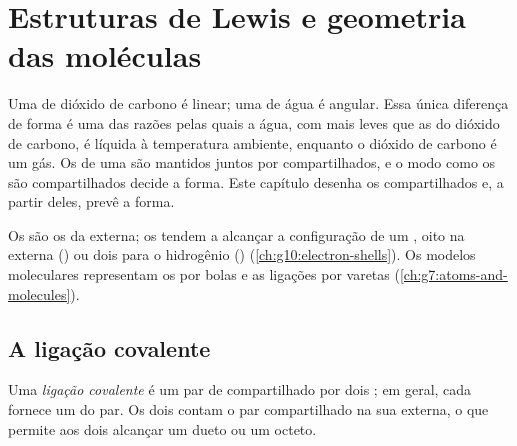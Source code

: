 \chapter{Estruturas de Lewis e geometria das moléculas}\label{ch:g10:lewis-and-shape}

Uma  de dióxido de carbono é linear; uma  de água é
angular. Essa única diferença de forma é uma das razões pelas quais a
água, com  mais leves que as do dióxido de carbono, é líquida à
temperatura ambiente, enquanto o dióxido de carbono é um gás. Os 
de uma  são mantidos juntos por  compartilhados, e o modo
como os  são compartilhados decide a forma. Este capítulo
desenha os  compartilhados e, a partir deles, prevê a forma.

\begin{recall}
Os  são os da  externa; os  tendem a
alcançar a configuração de um , oito  na  externa
() ou dois para o hidrogênio ()
(\cref{ch:g10:electron-shells}). Os modelos moleculares representam os
 por bolas e as ligações por varetas
(\cref{ch:g7:atoms-and-molecules}).
\end{recall}

\section{A ligação covalente}

\begin{definition}\label{def:g10:lewis-and-shape:covalent-bond}
Uma \emph{ligação covalente} é um par de
 compartilhado por dois ; em geral, cada  fornece um
 do par. Os dois  contam o par compartilhado na sua 
externa, o que permite aos dois alcançar um dueto ou um octeto.
\end{definition}

